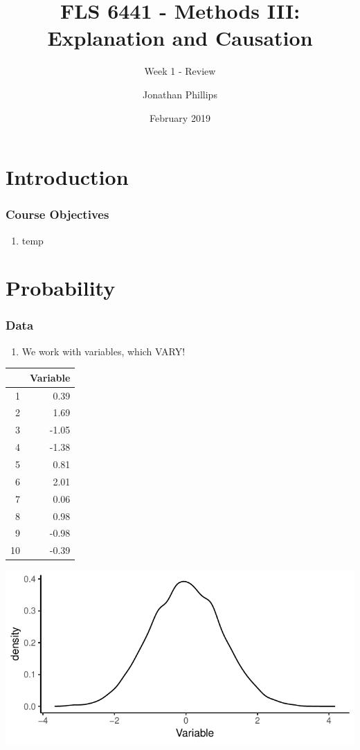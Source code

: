 \documentclass[xcolor=x11names,compress]{beamer}\usepackage[]{graphicx}\usepackage[]{color}
\title{FLS 6441 - Methods III: Explanation and Causation}
\subtitle{Week 1 - Review}
\author{Jonathan Phillips}
\date{February 2019}
\makeatletter
\def\maxwidth{ %
  \ifdim\Gin@nat@width>\linewidth
    \linewidth
  \else
    \Gin@nat@width
  \fi
}
\newenvironment{knitrout}{}{} %
\renewcommand{\(}{\begin{columns}}
\renewcommand{\)}{\end{columns}}
\newcommand{\<}[1]{\begin{column}{#1}}
\renewcommand{\>}{\end{column}}
\makeatother
\begin{document}
\frame{\titlepage}

\section{Introduction}

\begin{frame}
\frametitle{Course Objectives}
\begin{enumerate}
\item temp
\end{enumerate}
\end{frame}

\section{Probability}

\begin{frame}
\frametitle{Data}
\begin{enumerate}
\item We work with variables, which VARY!
\end{enumerate}
\begin{multicols}{2}
\begin{table}[ht]
\centering
\begin{tabular}{rr}
  \hline
 & Variable \\ 
  \hline
1 & 0.39 \\ 
  2 & 1.69 \\ 
  3 & -1.05 \\ 
  4 & -1.38 \\ 
  5 & 0.81 \\ 
  6 & 2.01 \\ 
  7 & 0.06 \\ 
  8 & 0.98 \\ 
  9 & -0.98 \\ 
  10 & -0.39 \\ 
   \hline
\end{tabular}
\end{table}

\columnbreak
\begin{knitrout}
\color{fgcolor}
\includegraphics[width=\maxwidth]{figure/var2-1} 

\end{knitrout}
\end{multicols}
\end{frame}
\end{document}
